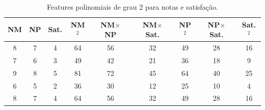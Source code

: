\begin{table}[H]
    \centering
    \caption{Features polinomiais de grau 2 para notas e satisfação.}
    \label{tab:q4-poly}
    \footnotesize
    \setlength{\tabcolsep}{2pt}
    \begin{tabular}{@{}ccccccccc@{}}
        \toprule
        NM & NP & Sat. &
        NM\(^2\) &
        \shortstack{NM\(\times\)\\NP} &
        \shortstack{NM\(\times\)\\Sat.} &
        NP\(^2\) &
        \shortstack{NP\(\times\)\\Sat.} &
        Sat.\(^2\) \\
        \midrule
        8 & 7 & 4 & 64 & 56 & 32 & 49 & 28 & 16 \\
        7 & 6 & 3 & 49 & 42 & 21 & 36 & 18 &  9 \\
        9 & 8 & 5 & 81 & 72 & 45 & 64 & 40 & 25 \\
        6 & 5 & 2 & 36 & 30 & 12 & 25 & 10 &  4 \\
        8 & 7 & 4 & 64 & 56 & 32 & 49 & 28 & 16 \\
        \bottomrule
    \end{tabular}
\end{table}
